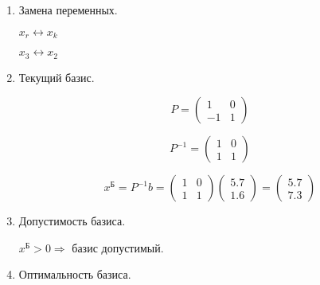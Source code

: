 \begin{enumerate}
\begin{enumerate}
	$r = argmin_i\left\{ \frac{x_i^{\text{Б}}}{z_i} \Bigl|_{z_i > 0} \right\}$
	
	$\frac{x^{\text{Б}}}{z} = \begin{pmatrix}
		\frac{5.7}{1} \\ \frac{1.6}{-1}
	\end{pmatrix}
	=
	\begin{pmatrix}
		5.7 \\ -1.6
	\end{pmatrix}$
	
	$r = 3$

	\item Замена переменных.
	
	$x_r \leftrightarrow x_k$
	
	$x_3 \leftrightarrow x_2$
	
	\item Текущий базис.
	
	\begin{displaymath}
		P = \begin{pmatrix}
			1 & 0 \\ -1 & 1
		\end{pmatrix}
	\end{displaymath}	
	
	\begin{displaymath}
		P^{-1} = \begin{pmatrix}
			1 & 0 \\ 1 & 1
		\end{pmatrix}
	\end{displaymath}		
	
	\begin{displaymath}
		x^{\text{Б}} = P^{-1}b = \begin{pmatrix}
			1 & 0 \\ 1 & 1
		\end{pmatrix}
		\begin{pmatrix}
			5.7 \\ 1.6
		\end{pmatrix}
		=
		\begin{pmatrix}
			5.7 \\ 7.3
		\end{pmatrix}
	\end{displaymath}
	
	\item Допустимость базиса.
	
	$x^{\text{Б}} > 0 \Rightarrow$ базис допустимый.
	
	\item Оптимальность базиса.
	

\end{enumerate}
\end{enumerate}

